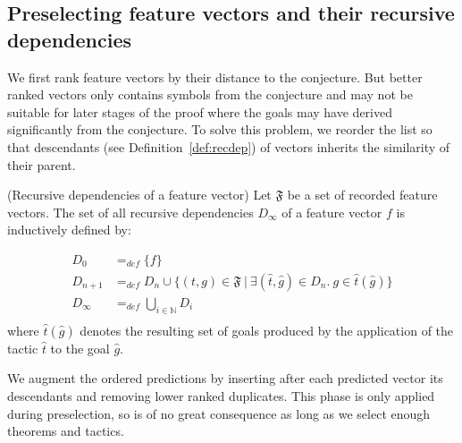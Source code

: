 \documentclass[runningheads,a4paper,draft]{svjour3}
\begin{document}


\subsection{Preselecting feature vectors and their  
recursive dependencies}\label{sec:dependencies}
We first rank feature vectors by their distance to the conjecture. But better 
ranked vectors only contains symbols from 
the conjecture and may not be suitable for later stages of the proof where the 
goals may have derived significantly from the conjecture. To solve this 
problem, we reorder the list so that descendants (see 
Definition~\ref{def:recdep}) of vectors inherits the similarity of their 
parent.

\begin{definition}(Recursive dependencies of a feature 
vector)\label{def:recdep}
Let $\mathfrak{F}$ be a set of recorded feature vectors. 
The set of all recursive dependencies $D_\infty$ of a feature vector $f$ is 
inductively defined by:

\begin{align*}
D_0 &=_{def} \lbrace f \rbrace \\
D_{n+1} &=_{def} D_n \cup \lbrace (t,g)\in \mathfrak{F}\  |\ \exists 
(\hat{t},\hat{g}) \in D_n.\ g \in \hat{t}(\hat{g}) \rbrace  \\
D_\infty &=_{def} \bigcup_{i \in \mathbb{N}} D_i\\
\end{align*}
where $\hat{t}(\hat{g})$ denotes the resulting set of goals produced by the 
application 
of the tactic $\hat{t}$ to the goal $\hat{g}$.
\end{definition}

We augment the ordered predictions by inserting after each predicted vector 
its descendants and removing lower ranked duplicates. 
 This phase is only applied 
during preselection, so is of no great consequence as long as we select enough 
theorems and tactics.
\end{document}
